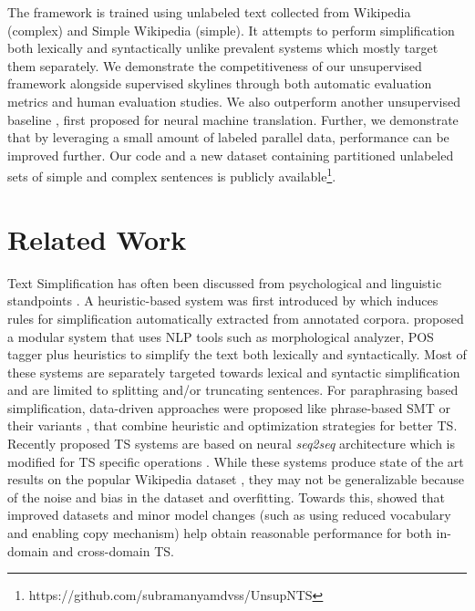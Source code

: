 \documentclass[11pt,a4paper]{article}
\begin{document}
The framework is trained using unlabeled text collected from Wikipedia (complex) and Simple Wikipedia (simple). It attempts to perform simplification both lexically and syntactically unlike prevalent systems which mostly target them separately. We demonstrate the competitiveness of our unsupervised framework alongside supervised skylines through both automatic evaluation metrics and human evaluation studies. We also outperform another unsupervised baseline \cite{artetxe2018iclr}, first proposed for neural machine translation. Further, we demonstrate that by leveraging a small amount of labeled parallel data, performance can be improved further. Our code and a new dataset containing partitioned unlabeled sets of simple and complex sentences is publicly available\footnote{https://github.com/subramanyamdvss/UnsupNTS}. 














%
 \section{Related Work}
\label{sec:related}
Text Simplification has often been discussed from psychological and linguistic standpoints \cite{lallier80eval,mcnamara1996good,linderholm2000effects}. A heuristic-based system was first introduced by  which induces rules for simplification automatically extracted from annotated corpora.  proposed a modular system that uses NLP tools such as morphological analyzer, POS tagger plus heuristics to simplify the text both lexically and syntactically. Most of these systems \cite{siddharthan2014survey} are separately targeted towards lexical and syntactic simplification and are limited to splitting and/or truncating sentences.   
For paraphrasing based simplification, data-driven approaches were proposed like phrase-based SMT \cite{specia2010translating,vstajner2015deeper} or their variants \cite{coster2011simple,xu2016optimizing}, that combine heuristic and optimization strategies for better TS. Recently proposed TS systems are based on neural \emph{seq2seq} architecture \cite{bahdanau2014neural} which is modified for TS specific operations \cite{wang2016text,nisioi2017exploring}. While these systems produce state of the art results on the popular Wikipedia dataset \cite{coster2011simple}, they may not be generalizable because of the noise and bias in the dataset \cite{xu2015problems} and overfitting. Towards this,  showed that improved datasets and minor model changes (such as using reduced vocabulary and enabling copy mechanism) help obtain reasonable performance for both in-domain and cross-domain TS. 
\end{document}
